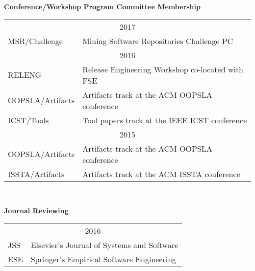 \documentclass[10pt]{article}
\begin{document}
\textbf{Conference/Workshop Program Committee Membership} \\
\vspace{-10pt}
\noindent\begin{tabular}{p{3cm}p{9.5cm}}
\multicolumn{2}{c}{2017}\\
MSR/Challenge & Mining Software Repositories Challenge PC\\
\multicolumn{2}{c}{2016}\\
RELENG & Release Engineering Workshop co-located with FSE\\
OOPSLA/Artifacts &Artifacts track at the ACM OOPSLA conference\\
ICST/Tools & Tool papers track at the IEEE ICST conference\\
\multicolumn{2}{c}{2015}\\
OOPSLA/Artifacts &Artifacts track at the ACM OOPSLA conference\\
ISSTA/Artifacts &Artifacts track at the ACM ISSTA conference\\

\end{tabular}\\
\vspace{10pt}


\textbf{Journal Reviewing} \\
\vspace{-10pt}
\noindent\begin{tabular}{p{3cm}p{9.5cm}}
\multicolumn{2}{c}{2016}\\
JSS&Elsevier's Journal of Systems and Software\\
ESE&Springer's Empirical Software Engineering\\
\end{tabular}\\
\vspace{10pt}
\end{document}
